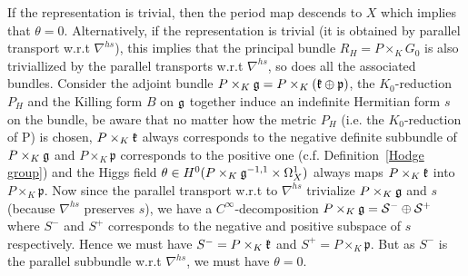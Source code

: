 \documentclass[aspectratio=169, 10pt]{beamer}
\theoremstyle{definition}
\theoremstyle{example}
\begin{document}
\begin{frame}[allowframebreaks]
		If the representation is trivial, then the period map descends to $X$ which implies that $\theta=0$. Alternatively, if the representation is trivial (it is obtained by parallel transport w.r.t $\nabla^{hs}$), this implies that the principal bundle $R_H=P\times_K G_0$ is also triviallized by the parallel transports w.r.t $\nabla^{hs}$, so does all the associated bundles. Consider the adjoint bundle $P\times_K \mathfrak{g}=P\times_K (\mathfrak{k} \oplus \mathfrak{p})$, the $K_0$-reduction $P_H$ and the Killing form $B$ on $\mathfrak{g}$ together induce an indefinite Hermitian form $s$ on the bundle, be aware that no matter how the metric $P_H$ (i.e. the $K_0$-reduction of P) is chosen, $P\times_K \mathfrak{k}$ always corresponds to the negative definite subbundle of $P\times_K \mathfrak{g}$ and $P\times_K \mathfrak{p}$ corresponds to the positive one (c.f. Definition~\ref{Hodge group}) and the Higgs field $\theta\in H^{0}(P\times_K \mathfrak{g}^{-1,1}\times \Omega_X^1)$ always maps $P\times_K \mathfrak{k}$ into $P\times_K \mathfrak{p}$. Now since the parallel transport w.r.t to $\nabla^{hs}$ trivialize $P\times_K \mathfrak{g}$ and $s$ (because $\nabla^{hs}$ preserves $s$), we have a $C^{\infty}$-decomposition $P\times_K \mathfrak{g}=\mathcal{S}^{-}\oplus \mathcal{S}^{+}$ where $S^-$ and $S^{+}$ corresponds to the negative and positive subspace of $s$ respectively. Hence we must have $S^{-}=P\times_K \mathfrak{k}$ and $S^{+}=P\times_K \mathfrak{p}$. But as $S^{-}$ is the parallel subbundle w.r.t $\nabla^{hs}$, we must have $\theta=0$.

	\end{frame}
\end{document}
